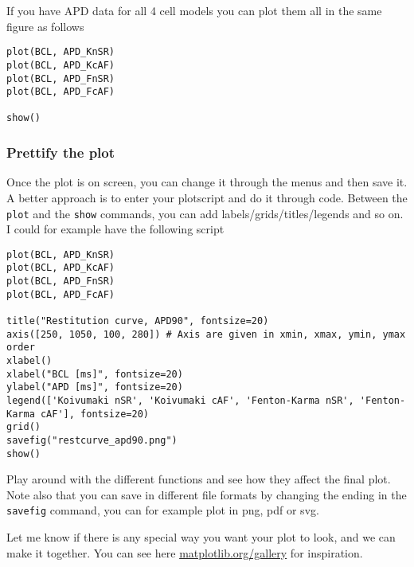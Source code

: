 \documentclass[a4paper, 11pt, notitlepage, english]{article}
\begin{document}
If you have APD data for all 4 cell models you can plot them all in the same figure as follows
\begin{lstlisting}
plot(BCL, APD_KnSR)
plot(BCL, APD_KcAF)
plot(BCL, APD_FnSR)
plot(BCL, APD_FcAF)

show()
\end{lstlisting}

\subsubsection*{Prettify the plot}

Once the plot is on screen, you can change it through the menus and then save it. A better approach is to enter your plotscript and do it through code. Between the \verb+plot+ and the \verb+show+ commands, you can add labels/grids/titles/legends and so on. I could for example have the following script

\begin{lstlisting}
plot(BCL, APD_KnSR)
plot(BCL, APD_KcAF)
plot(BCL, APD_FnSR)
plot(BCL, APD_FcAF)

title("Restitution curve, APD90", fontsize=20)
axis([250, 1050, 100, 280]) # Axis are given in xmin, xmax, ymin, ymax order
xlabel()
xlabel("BCL [ms]", fontsize=20)
ylabel("APD [ms]", fontsize=20)
legend(['Koivumaki nSR', 'Koivumaki cAF', 'Fenton-Karma nSR', 'Fenton-Karma cAF'], fontsize=20)
grid()
savefig("restcurve_apd90.png")
show()
\end{lstlisting}

Play around with the different functions and see how they affect the final plot. Note also that you can save in different file formats by changing the ending in the \verb+savefig+ command, you can for example plot in png, pdf or svg. 

Let me know if there is any special way you want your plot to look, and we can make it together. You can see here \url{matplotlib.org/gallery} for inspiration.
\end{document}
